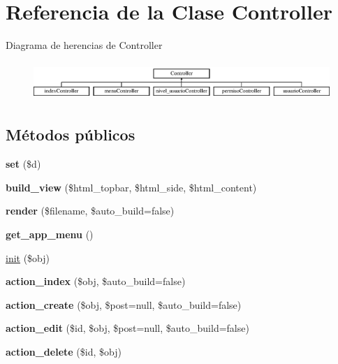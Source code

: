 \hypertarget{class_controller}{}\section{Referencia de la Clase Controller}
\label{class_controller}
Diagrama de herencias de Controller\begin{figure}[H]
\begin{center}
\leavevmode
\includegraphics[height=1.473684cm]{class_controller}
\end{center}
\end{figure}
\subsection*{Métodos públicos}
\begin{DoxyCompactItemize}
\item 
\mbox{\label{class_controller_a38f332ee34a419b4823ee8fceb93ee9b}} 
{\bfseries set} (\$d)
\item 
\mbox{\label{class_controller_a55553a742969bcff800422911074f3aa}} 
{\bfseries build\+\_\+view} (\$html\+\_\+topbar, \$html\+\_\+side, \$html\+\_\+content)
\item 
\mbox{\label{class_controller_a1875e07bb88f0e4fd6de0e17ab99ddf4}} 
{\bfseries render} (\$filename, \$auto\+\_\+build=false)
\item 
\mbox{\label{class_controller_add2524d0f5a4e181b7f2f21ea112946c}} 
{\bfseries get\+\_\+app\+\_\+menu} ()
\item 
\mbox{\hyperlink{class_controller_a628beb30f4b8e9158a41e228671cf5aa}{init}} (\$obj)
\item 
\mbox{\label{class_controller_a290b8d4edf5d50c84c41b23702929030}} 
{\bfseries action\+\_\+index} (\$obj, \$auto\+\_\+build=false)
\item 
\mbox{\label{class_controller_ac00c3f0fe81092f00cb0bf21f4b7401e}} 
{\bfseries action\+\_\+create} (\$obj, \$post=null, \$auto\+\_\+build=false)
\item 
\mbox{\label{class_controller_a2d0b210a9e4f026dde499fd26c4d42bb}} 
{\bfseries action\+\_\+edit} (\$id, \$obj, \$post=null, \$auto\+\_\+build=false)
\item 
\mbox{\label{class_controller_a400cb4f19ec8377eef15550db0ea0b8c}} 
{\bfseries action\+\_\+delete} (\$id, \$obj)
\end{DoxyCompactItemize}

